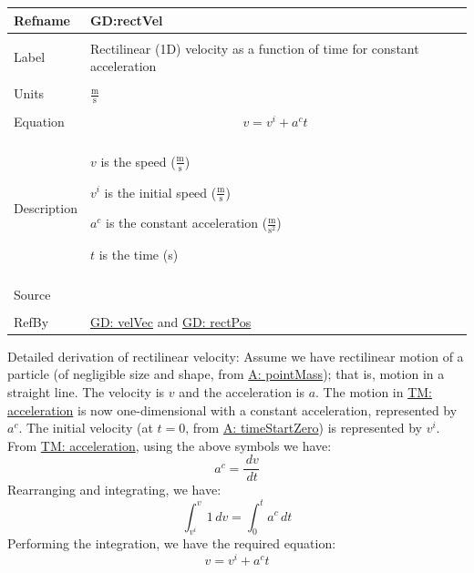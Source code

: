 \documentclass[12pt]{article}
\begin{document}
\noindent \begin{minipage}{\textwidth}
\begin{tabular}{>{\raggedright}p{}>{\raggedright\arraybackslash}p{}}
\toprule \textbf{Refname} & \textbf{GD:rectVel}
\label{GD:rectVel}
\\ \midrule \\
Label & Rectilinear (1D) velocity as a function of time for constant acceleration
\\ \midrule \\
Units & $\frac{\text{m}}{\text{s}}$
\\ \midrule \\
Equation & \begin{displaymath}
           v={v^{i}}+{a^{c}} t
           \end{displaymath}
\\ \midrule \\
Description & \begin{symbDescription}
              \item{$v$ is the speed ($\frac{\text{m}}{\text{s}}$)}
              \item{${v^{i}}$ is the initial speed ($\frac{\text{m}}{\text{s}}$)}
              \item{${a^{c}}$ is the constant acceleration ($\frac{\text{m}}{\text{s}^{2}}$)}
              \item{$t$ is the time (s)}
              \end{symbDescription}
\\ \midrule \\
Source & \cite[(pg. 8)]{hibbeler2004}
\\ \midrule \\
RefBy & \hyperref[GD:velVec]{GD: velVec} and \hyperref[GD:rectPos]{GD: rectPos}
\\ \bottomrule \end{tabular}
\end{minipage}
Detailed derivation of rectilinear velocity:
Assume we have rectilinear motion of a particle (of negligible size and shape, from \hyperref[pointMass]{A: pointMass}); that is, motion in a straight line. The velocity is $v$ and the acceleration is $a$. The motion in \hyperref[TM:acceleration]{TM: acceleration} is now one-dimensional with a constant acceleration, represented by ${a^{c}}$. The initial velocity (at $t=0$, from \hyperref[timeStartZero]{A: timeStartZero}) is represented by ${v^{i}}$. From \hyperref[TM:acceleration]{TM: acceleration}, using the above symbols we have:
\begin{displaymath}
{a^{c}}=\frac{\,dv}{\,dt}
\end{displaymath}
Rearranging and integrating, we have:
\begin{displaymath}
\int_{{v^{i}}}^{v}{1}\,dv=\int_{0}^{t}{{a^{c}}}\,dt
\end{displaymath}
Performing the integration, we have the required equation:
\begin{displaymath}
v={v^{i}}+{a^{c}} t
\end{displaymath}
\par~
\end{document}
